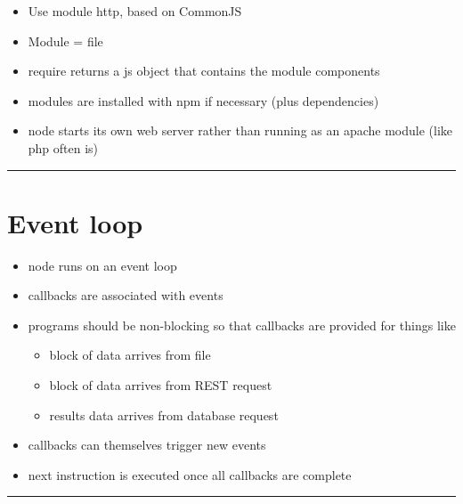 \documentclass{article}[18pt]
\providecommand{\tightlist}{%
	\setlength{\itemsep}{0pt}\setlength{\parskip}{0pt}}
\begin{document}
\begin{itemize}
	\tightlist
	\item
	Use module http, based on CommonJS
	\item
	Module = file
	\item
	require returns a js object that contains the module components
	\item
	modules are installed with npm if necessary (plus dependencies)
	\item
	node starts its own web server rather than running as an apache module
	(like php often is)
\end{itemize}

\begin{center}\rule{0.5\linewidth}{\linethickness}\end{center}

\hypertarget{event-loop}{%
	\section{Event loop}\label{event-loop}}

\begin{itemize}
	\tightlist
	\item
	node runs on an event loop
	\item
	callbacks are associated with events
	\item
	programs should be non-blocking so that callbacks are provided for
	things like
	
	\begin{itemize}
		\tightlist
		\item
		block of data arrives from file
		\item
		block of data arrives from REST request
		\item
		results data arrives from database request
	\end{itemize}
	\item
	callbacks can themselves trigger new events
	\item
	next instruction is executed once all callbacks are complete
\end{itemize}

\begin{center}\rule{0.5\linewidth}{\linethickness}\end{center}
\end{document}

